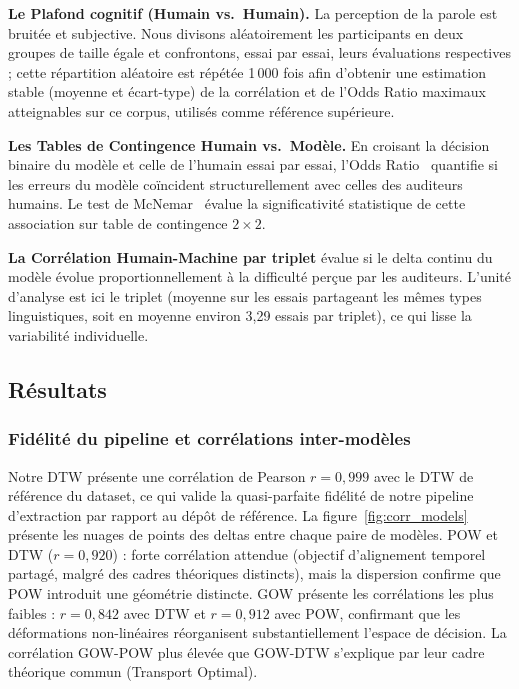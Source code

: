 \documentclass{article}
\begin{document}
\textbf{Le Plafond cognitif (Humain vs.\ Humain).} La perception de la
parole est bruitée et subjective. Nous divisons aléatoirement les
participants en deux groupes de taille égale et confrontons, essai par
essai, leurs évaluations respectives ; cette répartition aléatoire est
répétée 1\,000 fois afin d'obtenir une estimation stable (moyenne et écart-type)
de la corrélation et de l'Odds Ratio maximaux atteignables sur ce corpus,
utilisés comme référence supérieure.

\textbf{Les Tables de Contingence Humain vs.\ Modèle.} En croisant la
décision binaire du modèle et celle de l'humain essai par essai, l'Odds
Ratio~\cite{oddsratio} quantifie si les erreurs du modèle coïncident
structurellement avec celles des auditeurs humains. Le test de
McNemar~\cite{mcnemar} évalue la significativité statistique de cette
association sur table de contingence $2 \times 2$.

\textbf{La Corrélation Humain-Machine par triplet} évalue si le
delta continu du modèle évolue proportionnellement à la difficulté perçue
par les auditeurs. L'unité d'analyse est ici le triplet (moyenne
sur les essais partageant les mêmes types linguistiques, soit en moyenne
environ 3,29 essais par triplet), ce qui lisse la variabilité
individuelle.

\subsection{Résultats}
\label{sec:resultats_details}

\subsubsection{Fidélité du pipeline et corrélations inter-modèles}

Notre DTW présente une corrélation de Pearson $r = 0{,}999$ avec le DTW
de référence du dataset, ce qui valide la quasi-parfaite fidélité de notre
pipeline d'extraction par rapport au dépôt de référence.
La figure~\ref{fig:corr_models} présente les nuages de points des deltas
entre chaque paire de modèles.
POW et DTW ($r = 0{,}920$) : forte corrélation attendue (objectif
d'alignement temporel partagé, malgré des cadres théoriques distincts), mais la dispersion confirme que POW introduit une
géométrie distincte. GOW présente les corrélations
les plus faibles : $r = 0{,}842$ avec DTW et $r = 0{,}912$ avec POW,
confirmant que les déformations non-linéaires réorganisent substantiellement
l'espace de décision. La corrélation GOW-POW plus élevée que GOW-DTW
s'explique par leur cadre théorique commun (Transport Optimal).
\end{document}
